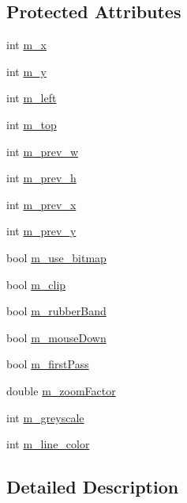 \subsection*{Protected Attributes}
\begin{DoxyCompactItemize}
\item 
int \hyperlink{class_plot_panel_abd0a64bd20aec2e300e383abfd60315d}{m\-\_\-x}
\item 
int \hyperlink{class_plot_panel_a822981fef8ff50da327b3dbca9fd2777}{m\-\_\-y}
\item 
int \hyperlink{class_plot_panel_ab41676a2e46c2e801bc639c274a7d5f5}{m\-\_\-left}
\item 
int \hyperlink{class_plot_panel_a8c49969c560b64902272347835f151a0}{m\-\_\-top}
\item 
int \hyperlink{class_plot_panel_a398b423039df00405f2f23b786a02b0d}{m\-\_\-prev\-\_\-w}
\item 
int \hyperlink{class_plot_panel_af85cf51a62f09adf0cbb4eb35d7cfc97}{m\-\_\-prev\-\_\-h}
\item 
int \hyperlink{class_plot_panel_ab38a4323755a529cbdab28a5854ffc06}{m\-\_\-prev\-\_\-x}
\item 
int \hyperlink{class_plot_panel_a2e1ea18bbea07dd04acc76567a993070}{m\-\_\-prev\-\_\-y}
\item 
bool \hyperlink{class_plot_panel_a20336cef42ecb91f0fd1f9af1f70ba43}{m\-\_\-use\-\_\-bitmap}
\item 
bool \hyperlink{class_plot_panel_a07334de87de07eeab43eabbdaf730ab5}{m\-\_\-clip}
\item 
bool \hyperlink{class_plot_panel_a7182715e509f98f42e78210d324fe042}{m\-\_\-rubber\-Band}
\item 
bool \hyperlink{class_plot_panel_acebe9485868374626f03516e3508b592}{m\-\_\-mouse\-Down}
\item 
bool \hyperlink{class_plot_panel_a1bb0714da68ee75a51a4ebb9e9ea3cad}{m\-\_\-first\-Pass}
\item 
double \hyperlink{class_plot_panel_ae2f4907a8e4ed958ef4995e99b1f7148}{m\-\_\-zoom\-Factor}
\item 
int \hyperlink{class_plot_panel_ab5bc0c62a2dcfccb9e0d9663d7983e3f}{m\-\_\-greyscale}
\item 
int \hyperlink{class_plot_panel_aff281e896bdb1f76d9ccbbe1d15c721d}{m\-\_\-line\-\_\-color}
\end{DoxyCompactItemize}


\subsection{Detailed Description}


